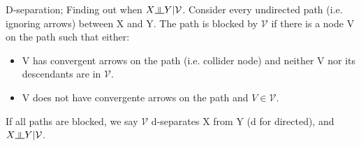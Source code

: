 \documentclass{article}
\newcommand{\indep}{\rotatebox[origin=c]{90}{$\models$}}
\begin{document}
D-separation; Finding out when $X \indep Y | \mathcal{V}$. Consider every undirected path (i.e. ignoring arrows) between X and Y. The path is blocked by $\mathcal{V}$ if there is a node V on the path such that either: \begin{itemize}
	\item V has convergent arrows on the path (i.e. collider node) and neither V nor its descendants are in $\mathcal{V}$.
	\item V does not have convergente arrows on the path and $V\in\mathcal{V}$.
\end{itemize}
If all paths are blocked, we say $\mathcal{V}$ d-separates X from Y (d for directed), and $X \indep Y | \mathcal{V}$.
\end{document}
